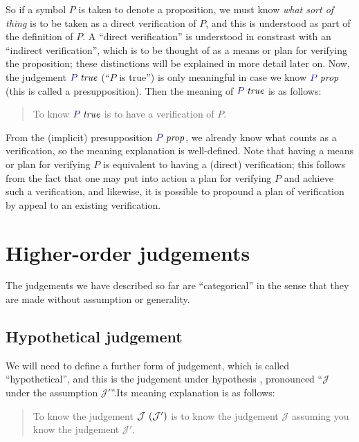 \documentclass[main.tex]{subfiles}
\begin{document}
So if a symbol $P$ is taken to denote a proposition, we must know
\emph{what sort of thing} is to be taken as a direct verification of
$P$, and this is understood as part of the definition of $P$. A
``direct verification'' is understood in constrast with an ``indirect
verification'', which is to be thought of as a means or plan for
verifying the proposition; these distinctions will be explained in
more detail later on. Now, the judgement $\istrue{P}$ (``$P$ is
true'') is only meaningful in case we know $\isprop{P}$ (this is
called a presupposition). Then the meaning of $\istrue{P}$ is as
follows:

\begin{quote}
  To know $\istrue{P}$ is to have a verification of $P$.
\end{quote}

From the (implicit) presupposition $\isprop{P}$, we already know what
counts as a verification, so the meaning explanation is
well-defined. Note that having a means or plan for verifying $P$ is
equivalent to having a (direct) verification; this follows from the
fact that one may put into action a plan for verifying $P$ and achieve
such a verification, and likewise, it is possible to propound a plan
of verification by appeal to an existing verification.

\section{Higher-order judgements}

The judgements we have described so far are ``categorical'' in the sense that
they are made without assumption or generality.

\subsection{Hypothetical judgement}

We will need to define a further form of judgement, which is called
``hypothetical'', and this is the judgement under hypothesis
, pronounced
``$\mathcal{J}$ under the assumption $\mathcal{J}'$''.Its meaning
explanation is as follows:

\begin{quote}
  To know the judgement $\mathcal{J}\ (\mathcal{J}')$ is to know
  the judgement $\mathcal{J}$ assuming you know the
  judgement $\mathcal{J}'$.
\end{quote}
\end{document}
